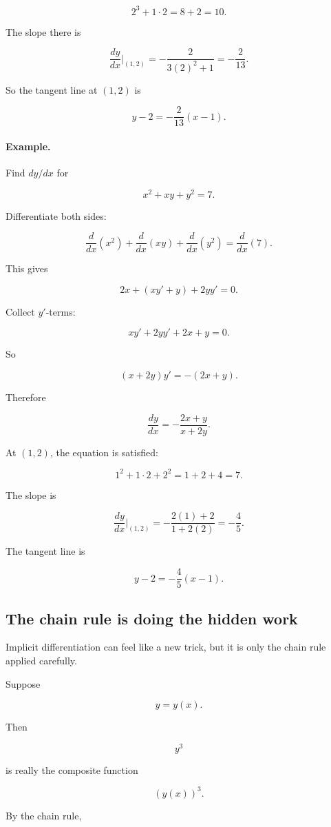 \[
2^3+1\cdot2=8+2=10.
\]

The slope there is

\[
\frac{dy}{dx}\bigg|_{(1,2)}
=
-\frac{2}{3(2)^2+1}
=
-\frac{2}{13}.
\]

So the tangent line at \((1,2)\) is

\[
y-2=-\frac{2}{13}(x-1).
\]

\paragraph{Example.}
Find \(dy/dx\) for

\[
x^2+xy+y^2=7.
\]

Differentiate both sides:

\[
\frac{d}{dx}(x^2)
+
\frac{d}{dx}(xy)
+
\frac{d}{dx}(y^2)
=
\frac{d}{dx}(7).
\]

This gives

\[
2x+(xy'+y)+2yy'=0.
\]

Collect \(y'\)-terms:

\[
xy'+2yy'+2x+y=0.
\]

So

\[
(x+2y)y'=-(2x+y).
\]

Therefore

\[
\boxed{
\frac{dy}{dx}
=
-\frac{2x+y}{x+2y}.
}
\]

At \((1,2)\), the equation is satisfied:

\[
1^2+1\cdot2+2^2=1+2+4=7.
\]

The slope is

\[
\frac{dy}{dx}\bigg|_{(1,2)}
=
-\frac{2(1)+2}{1+2(2)}
=
-\frac45.
\]

The tangent line is

\[
y-2=-\frac45(x-1).
\]

\subsection{The chain rule is doing the hidden work}
\label{subsec:hidden-chain-rule-implicit}

Implicit differentiation can feel like a new trick, but it is only the chain rule applied carefully.

Suppose

\[
y=y(x).
\]

Then

\[
y^3
\]

is really the composite function

\[
(y(x))^3.
\]

By the chain rule,

